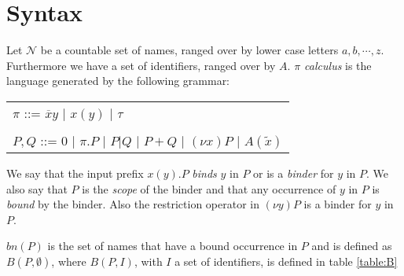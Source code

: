 
\section{Syntax}

\begin{definition}
  Let $\mathcal{N}$ be a countable set of names, ranged over by lower case letters $a,b, \cdots, z$. Furthermore we have a set of identifiers, ranged over by $A$. \emph{$\pi$ calculus} is the language generated by the following grammar:
  \begin{center}
    \begin{tabular}{l}
	$\pi$ ::= $\overline{x}y$ $\mid$ $x(y)$ $\mid$ $\tau$ 
      \\\\
	$P,Q$ ::= $0$ $\mid$ $\pi.P$ $\mid$ $P|Q$ $\mid$ $P+Q$ $\mid$ $(\nu x) P$ $\mid$ $A(\tilde{x})$ 
    \end{tabular}
  \end{center}
\end{definition}

\begin{definition}
  We say that the input prefix $x(y).P$ \emph{binds} $y$ in $P$ or is a \emph{binder} for $y$ in $P$. We also say that $P$ is the \emph{scope} of the binder and that any occurrence of $y$ in $P$ is \emph{bound} by the binder. Also the restriction operator in $(\nu y)P$ is a binder for $y$ in $P$. 
\end{definition}

\begin{definition}
  $bn(P)$ is the set of names that have a bound occurrence in $P$ and is defined as $B(P, \emptyset)$, where $B(P, I)$, with $I$ a set of identifiers, is defined in table \ref{table:B}
\end{definition}

